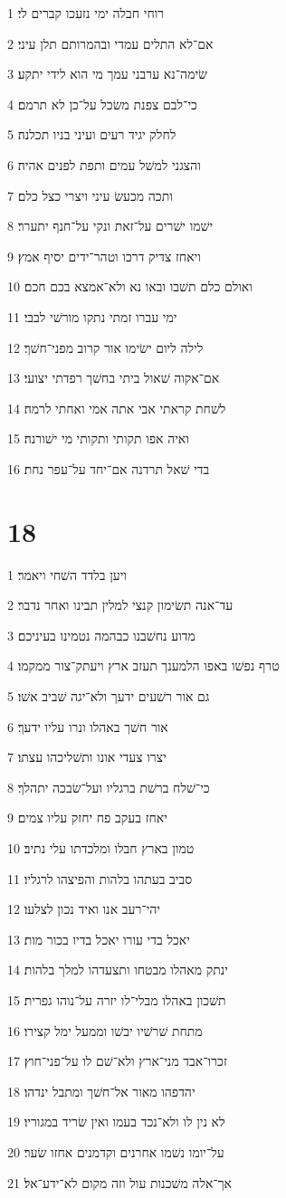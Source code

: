 \par 1 רוחי חבלה ימי נזעכו קברים לי׃
\par 2 אם־לא התלים עמדי ובהמרותם תלן עיני׃
\par 3 שׂימה־נא ערבני עמך מי הוא לידי יתקע׃
\par 4 כי־לבם צפנת משׂכל על־כן לא תרמם׃
\par 5 לחלק יגיד רעים ועיני בניו תכלנה׃
\par 6 והצגני למשׁל עמים ותפת לפנים אהיה׃
\par 7 ותכה מכעשׂ עיני ויצרי כצל כלם׃
\par 8 ישׁמו ישׁרים על־זאת ונקי על־חנף יתערר׃
\par 9 ויאחז צדיק דרכו וטהר־ידים יסיף אמץ׃
\par 10 ואולם כלם תשׁבו ובאו נא ולא־אמצא בכם חכם׃
\par 11 ימי עברו זמתי נתקו מורשׁי לבבי׃
\par 12 לילה ליום ישׂימו אור קרוב מפני־חשׁך׃
\par 13 אם־אקוה שׁאול ביתי בחשׁך רפדתי יצועי׃
\par 14 לשׁחת קראתי אבי אתה אמי ואחתי לרמה׃
\par 15 ואיה אפו תקותי ותקותי מי ישׁורנה׃
\par 16 בדי שׁאל תרדנה אם־יחד על־עפר נחת׃

\chapter{18}

\par 1 ויען בלדד השׁחי ויאמר׃
\par 2 עד־אנה תשׂימון קנצי למלין תבינו ואחר נדבר׃
\par 3 מדוע נחשׁבנו כבהמה נטמינו בעיניכם׃
\par 4 טרף נפשׁו באפו הלמענך תעזב ארץ ויעתק־צור ממקמו׃
\par 5 גם אור רשׁעים ידעך ולא־יגה שׁביב אשׁו׃
\par 6 אור חשׁך באהלו ונרו עליו ידעך׃
\par 7 יצרו צעדי אונו ותשׁליכהו עצתו׃
\par 8 כי־שׁלח ברשׁת ברגליו ועל־שׂבכה יתהלך׃
\par 9 יאחז בעקב פח יחזק עליו צמים׃
\par 10 טמון בארץ חבלו ומלכדתו עלי נתיב׃
\par 11 סביב בעתהו בלהות והפיצהו לרגליו׃
\par 12 יהי־רעב אנו ואיד נכון לצלעו׃
\par 13 יאכל בדי עורו יאכל בדיו בכור מות׃
\par 14 ינתק מאהלו מבטחו ותצעדהו למלך בלהות׃
\par 15 תשׁכון באהלו מבלי־לו יזרה על־נוהו גפרית׃
\par 16 מתחת שׁרשׁיו יבשׁו וממעל ימל קצירו׃
\par 17 זכרו־אבד מני־ארץ ולא־שׁם לו על־פני־חוץ׃
\par 18 יהדפהו מאור אל־חשׁך ומתבל ינדהו׃
\par 19 לא נין לו ולא־נכד בעמו ואין שׂריד במגוריו׃
\par 20 על־יומו נשׁמו אחרנים וקדמנים אחזו שׂער׃
\par 21 אך־אלה משׁכנות עול וזה מקום לא־ידע־אל׃

